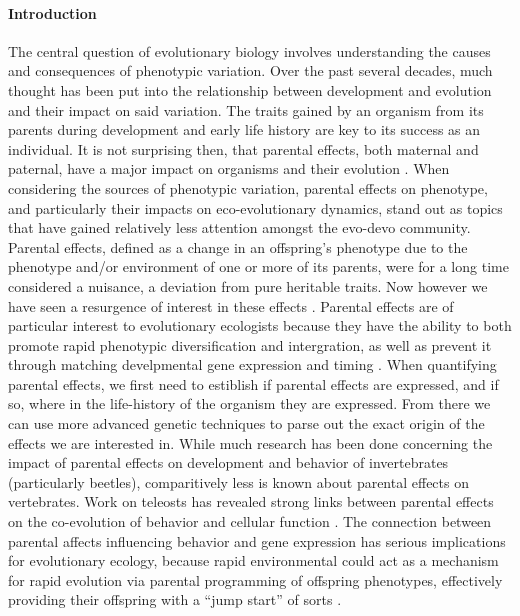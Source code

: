 \documentclass[12pt]{extarticle}
\begin{document}
\paragraph{Introduction}
The central question of evolutionary biology involves understanding the causes and consequences of phenotypic variation. Over the past several decades, much thought has been put into the relationship between development and evolution and their impact on said variation.
The traits gained by an organism from its parents during development and early life history are key to its success as an individual. It is not surprising then, that parental effects, both maternal and paternal, have a major impact on organisms and their evolution \citep{charmantier_garant_kruuk_2014, Danchin2011, Badyaev2009}. When considering the sources of phenotypic variation, parental effects on phenotype, and particularly their impacts on eco-evolutionary dynamics, stand out as topics that have gained relatively less attention amongst the evo-devo community. Parental effects, defined as a change in an offspring's phenotype due to the phenotype and/or environment of one or more of its parents, were for a long time considered a nuisance, a deviation from pure heritable traits. Now however we have seen a resurgence of interest in these effects \citep{charmantier_garant_kruuk_2014}.
Parental effects are of particular interest to evolutionary ecologists because they have the ability to both promote rapid phenotypic diversification and intergration, as well as prevent it through matching develpmental gene expression and timing \citep{Badyaev2009}. When quantifying parental effects, we first need to estiblish if parental effects are expressed, and if so, where in the life-history of the organism they are expressed. From there we can use more advanced genetic techniques to parse out the exact origin of the effects we are interested in. While much research has been done concerning the impact of parental effects on development \citep{Tigreros2021} and behavior of invertebrates (particularly beetles), comparitively less is known about parental effects on vertebrates. Work on teleosts has revealed strong links between parental effects on the co-evolution of behavior and cellular function \citep{Yoshizawa2012}. The connection between parental affects influencing behavior and gene expression has serious implications for evolutionary ecology, because rapid environmental could act as a mechanism for rapid evolution via parental programming of offspring phenotypes, effectively providing their offspring with a ``jump start'' of sorts \citep{Danchin2011, Donelson2018}. 
\end{document}

